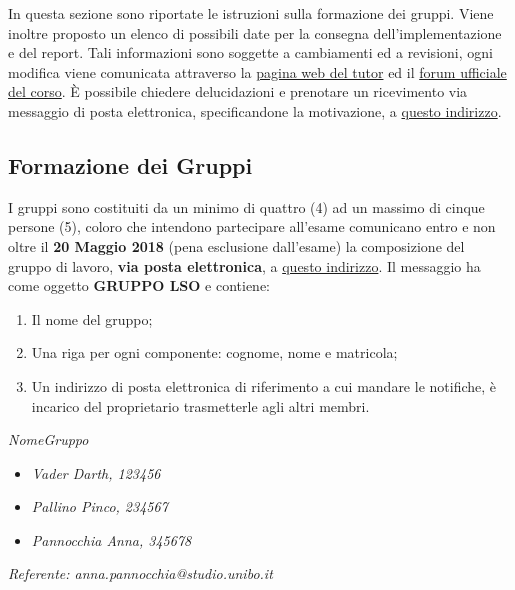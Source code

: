 
In questa sezione sono riportate le istruzioni sulla formazione dei gruppi.
Viene inoltre proposto un elenco di possibili date per la consegna
dell'implementazione e del report. Tali informazioni sono soggette a cambiamenti
ed a revisioni, ogni modifica viene comunicata attraverso la
\href{https://szingaro.github.io/education/so-lab-cs.html}{pagina web del tutor}
ed il \href{https://groups.google.com/forum/#!forum/infoman-so}{forum ufficiale
del corso}. È possibile chiedere delucidazioni e prenotare un ricevimento via
messaggio di posta elettronica, specificandone la motivazione, a
\href{mailto:stefanopio.zingaro@unibo.it}{questo indirizzo}.

\subsection{Formazione dei Gruppi}

I gruppi sono costituiti da un minimo di quattro (4) ad un massimo di cinque
persone (5), coloro che intendono partecipare all'esame comunicano entro e non
oltre il \textbf{20 Maggio 2018} (pena esclusione dall'esame) la composizione
del gruppo di lavoro, \textbf{via posta elettronica}, a
\href{mailto:stefanopio.zingaro@unibo.it}{questo indirizzo}. Il messaggio ha
come oggetto \textbf{GRUPPO LSO} e contiene:

\begin{enumerate}
 \item Il nome del gruppo;
 \item Una riga per ogni componente: cognome, nome e matricola;
 \item Un indirizzo di posta elettronica di riferimento a cui mandare le notifiche, è incarico del proprietario trasmetterle agli altri membri.
\end{enumerate}

\begin{tcolorbox}[colback=green!20!white,colframe=green!75!black,title=Email di esempio con oggetto \textbf{GRUPPO LSO}]
 \textit{NomeGruppo}
 \begin{itemize}
  \item \textit{Vader Darth, 123456}
  \item \textit{Pallino Pinco, 234567}
  \item \textit{Pannocchia Anna, 345678}
 \end{itemize}
 \textit{Referente: anna.pannocchia@studio.unibo.it}
\end{tcolorbox}

